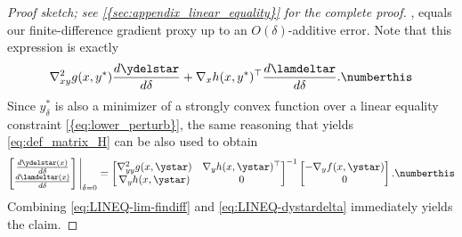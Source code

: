 \begin{proof}[Proof sketch; see \cref{{sec:appendix_linear_equality}} for the complete proof]
, equals our finite-difference gradient proxy up to an $O(\delta)$-additive error. Note that this expression  is exactly \[\nabla^2_{xy} g(x,y^*) \frac{d\ydelstar}{d\delta} + \nabla_x h(x,y^*)^\top \frac{d\lamdeltar}{d\delta}.\numberthis\label{eq:LINEQ-lim-findiff}\] Since  $y^*_{\delta}$ is also a minimizer of a strongly convex function over a linear equality constraint \cref{{eq:lower_perturb}}, the same reasoning that yields \cref{eq:def_matrix_H} can be also used to obtain 
\[
\begin{bmatrix}\frac{d\ydelstar(x)}{d\delta}\\
\frac{d\lamdeltar(x)}{d\delta}
\end{bmatrix}\Bigg|_{\delta=0}=\begin{bmatrix}\nabla^2_{yy} g(x,\ystar) & \nabla_y h(x,\ystar)^{\top}\\
\nabla_y h(x,\ystar) & 0
\end{bmatrix}^{-1}\begin{bmatrix}-\nabla_y f(x,\ystar)\\
0
\end{bmatrix}. \numberthis\label{eq:LINEQ-dystardelta}
\] Combining \cref{eq:LINEQ-lim-findiff} and \cref{eq:LINEQ-dystardelta}  immediately yields the claim. 
\end{proof}


